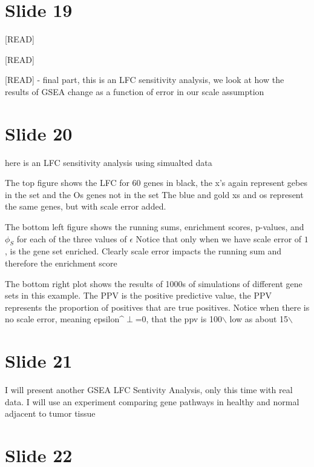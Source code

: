 \documentclass[11pt]{article}
\begin{document}
\section{Slide 19}
\label{sec:org652c7ed}

[READ]

[READ]

[READ] - final part, this is an LFC sensitivity analysis, we look at how the results of GSEA change as a
function of error in our scale assumption

\section{Slide 20}
\label{sec:org478e975}

here is an LFC sensitivity analysis using simualted data

The top figure shows the LFC for 60 genes in black, the x's again represent gebes in the set and the Os genes not in the set
The blue and gold xs and os represent the same genes, but with scale error added.

The bottom left figure shows the running sums, enrichment scores, p-values, and \(\phi_S\) for each of the three values of \(\epsilon\)
Notice that only when we have scale error of \(1\), is the gene set enriched. Clearly scale error impacts the running sum and
therefore the enrichment score

The bottom right plot shows the results of 1000s of simulations of different gene sets in this example.
The PPV is the positive predictive value, the PPV represents the proportion of positives that are true
positives. Notice when there is no scale error, meaning epsilon\^{}\(\perp\)=0, that the ppv is 100$\backslash$%
low as about 15$\backslash$%

\section{Slide 21}
\label{sec:orgef86813}

I will present another GSEA LFC Sentivity Analysis, only this time with real data. I will use an experiment
comparing gene pathways in healthy and normal adjacent to tumor tissue

\section{Slide 22}
\label{sec:org6c2daef}
\end{document}
